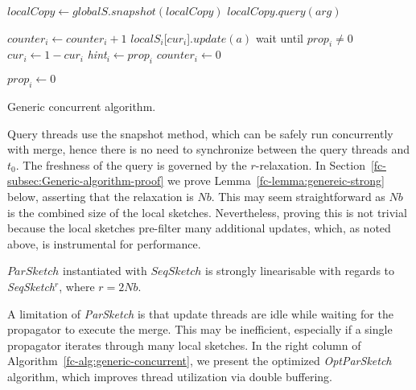 \begin{algorithm}[htb]
\begin{multicols}{2}
\begin{algorithmic}[1]
    \State $localCopy \leftarrow globalS.snapshot(localCopy)$
    \State \Return $localCopy.query(arg)$
    \EndProcedure
    
     \Return 
    \EndIf
    \State $counter_i \leftarrow counter_i + 1$ 
    \State $localS_i$[$cur_i$]$.update(a)$ \label{fc-opt:l:update}
     \label{fc-opt:l:checkfull}
    \State 
    \State wait until $prop_i \neq 0$  \label{fc-opt:l:wait}
    \State $cur_i \leftarrow 1 - cur_i$ \label{fc-opt:l:swap-local-aux}
    \State \emph{hint}$_i \leftarrow prop_i$ \label{fc-opt:l:updateHint}
    \State $counter_i \leftarrow 0$ \label{fc-opt:l:zeroCounter}


    \State $prop_i \leftarrow 0$ \label{fc-opt:l:signal}
    \EndIf
    \EndProcedure


    \end{algorithmic}
   \end{multicols}
    \caption{Generic concurrent algorithm.}
    \label{fc-alg:generic-concurrent}
\end{algorithm}



Query threads use the snapshot method, which can be safely run concurrently with merge,
hence there is no need to synchronize between the query threads and $t_0$. The freshness
of the query is governed by the $r$-relaxation.
In Section~\ref{fc-subsec:Generic-algorithm-proof}
we prove Lemma~\ref{fc-lemma:genereic-strong} below, asserting that
the relaxation is $Nb$. This may seem straightforward as $Nb$ is the combined size of the
local sketches. Nevertheless, proving this is not trivial because the local sketches pre-filter
many additional updates, which, as noted above, is instrumental for performance. 

\begin{lemma}
    $ParSketch$ instantiated with $SeqSketch$ is strongly linearisable with regards to  \emph{SeqSketch}$^r$, where
		$r=2Nb$.
    \label{fc-lemma:genereic-strong}
\end{lemma}


A limitation of \emph{ParSketch} is that update threads are idle while waiting for the propagator to execute the merge. This
may be inefficient, especially if a single propagator iterates through many local sketches.
In the right column of Algorithm~\ref{fc-alg:generic-concurrent}, we  present
the optimized \emph{OptParSketch} algorithm, which improves thread utilization via
double buffering.


